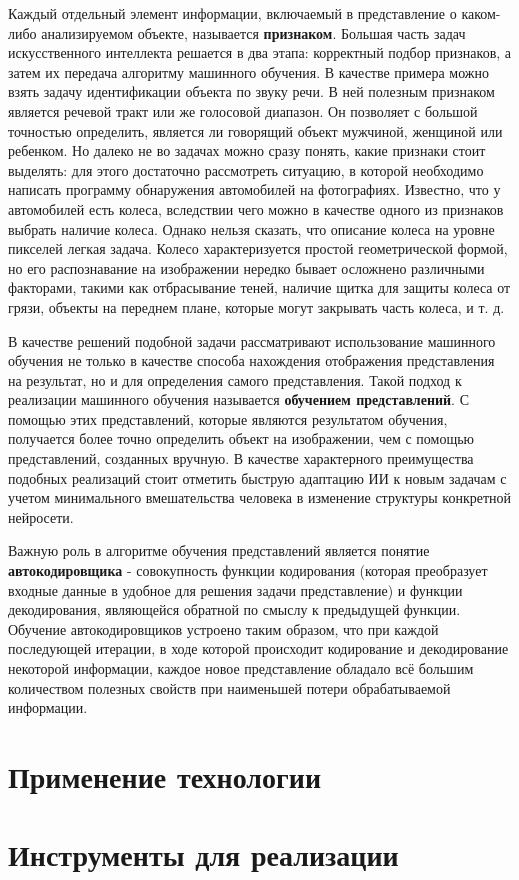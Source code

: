 \documentclass[bachelor, och, coursework]{shiza}
\begin{document}
    Каждый отдельный элемент информации, включаемый в представление о каком-либо анализируемом объекте, называется \textbf{признаком}. Большая часть задач искусственного интеллекта решается в два этапа: корректный подбор признаков, а затем их передача алгоритму машинного обучения. В качестве примера можно взять задачу идентификации объекта по звуку речи. В ней полезным признаком является речевой тракт или же голосовой диапазон. Он
    позволяет с большой точностью определить, является ли говорящий объект мужчиной, женщиной или
    ребенком.
    Но далеко не во задачах можно сразу понять, какие признаки стоит выделять: для этого достаточно рассмотреть ситуацию, в которой необходимо написать программу обнаружения автомобилей на фотографиях. Известно, что у автомобилей есть колеса, вследствии чего можно в качестве одного из признаков выбрать наличие колеса. Однако нельзя сказать, что описание колеса на уровне пикселей легкая задача.
    Колесо характеризуется простой геометрической формой, но его распознавание на изображении
    нередко бывает осложнено различными факторами, такими как отбрасывание теней, наличие щитка для защиты колеса от грязи, объекты на переднем плане, которые могут закрывать часть колеса, и т. д.

    В качестве решений подобной задачи рассматривают использование машинного обучения не только в качестве способа нахождения отображения представления на результат, но и для определения самого представления. Такой подход к реализации машинного обучения называется \textbf{обучением представлений}. С помощью этих представлений, которые являются результатом обучения, получается более точно определить объект на изображении, чем с помощью представлений, созданных вручную. В качестве характерного преимущества подобных реализаций стоит отметить быструю адаптацию ИИ к новым задачам с учетом минимального вмешательства человека в изменение структуры конкретной нейросети. 

    Важную роль в алгоритме обучения представлений является понятие \textbf{автокодировщика} - совокупность функции кодирования (которая преобразует входные данные в удобное для решения задачи представление) и функции декодирования, являющейся обратной по смыслу к предыдущей функции. Обучение автокодировщиков устроено таким образом, что при каждой последующей итерации, в ходе которой происходит кодирование и декодирование некоторой информации, каждое новое представление обладало всё большим количеством полезных свойств при наименьшей потери обрабатываемой информации.
\section{Применение технологии}

    
\section{Инструменты для реализации}

\conclusion
\end{document}
